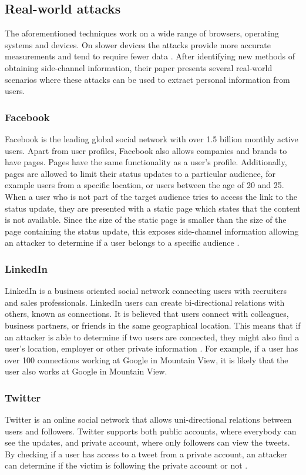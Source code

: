 \documentclass[10pt,a4paper,twoside]{book}
\begin{document}
\subsection{Real-world attacks}
The aforementioned techniques work on a wide range of browsers, operating systems and devices. On slower devices the attacks provide more accurate measurements and tend to require fewer data \cite{van2015clock}. After identifying new methods of obtaining side-channel information, their paper  presents several real-world scenarios where these attacks can be used to extract personal information from users. 

\subsubsection{Facebook}
Facebook is the leading global social network with over 1.5 billion monthly active users. Apart from user profiles, Facebook also allows companies and brands to have pages. Pages have the same functionality as a user's profile. Additionally, pages are allowed to limit their status updates to a particular audience, for example users from a specific location, or users between the age of 20 and 25. When a user who is not part of the target audience tries to access the link to the status update, they are presented with a static page which states that the content is not available. Since the size of the static page is smaller than the size of the page containing the status update, this exposes side-channel information allowing an attacker to determine if a user belongs to a specific audience \cite{van2015clock}.

\subsubsection{LinkedIn}
LinkedIn is a business oriented social network connecting users with recruiters and sales professionals. LinkedIn users can create bi-directional relations with others, known as connections. It is believed that users connect with colleagues, business partners, or friends in the same geographical location. This means that if an attacker is able to determine if two users are connected, they might also find a user's location, employer or other private information \cite{van2015clock}. For example, if a user has over 100 connections working at Google in Mountain View, it is likely that the user also works at Google in Mountain View.

\subsubsection{Twitter}
Twitter is an online social network that allows uni-directional relations between users and followers. Twitter supports both public accounts, where everybody can see the updates, and private account, where only followers can view the tweets. By checking if a user has access to a tweet from a private account, an attacker can determine if the victim is following the private account or not \cite{van2015clock}.
\end{document}
